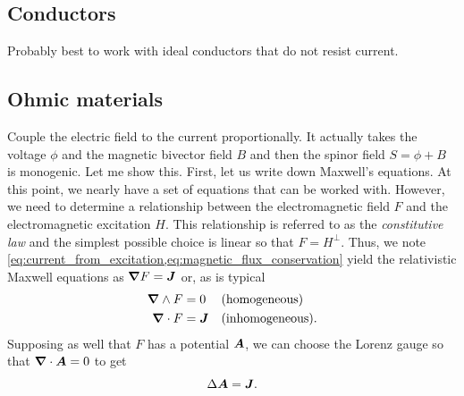 \documentclass{article}
\begin{document}
\subsection{Conductors}

Probably best to work with ideal conductors that do not resist current.

\subsection{Ohmic materials}

Couple the electric field to the current proportionally. It actually takes the voltage $\phi$ and the magnetic bivector field $B$ and then the spinor field $S=\phi +B$ is monogenic. Let me show this. First, let us write down Maxwell's equations. At this point, we nearly have a set of equations that can be worked with. However, we need to determine a relationship between the electromagnetic field $F$ and the electromagnetic excitation $H$. This relationship is referred to as the \emph{constitutive law} and the simplest possible choice is linear so that $F = H^\perp$. Thus, we note \cref{eq:current_from_excitation,eq:magnetic_flux_conservation} yield the relativistic Maxwell equations as $\boldsymbol{\nabla} F = \boldsymbol{J}$ or, as is typical
\begin{align}
	\boldsymbol{\nabla} \wedge F &= 0  &&\textrm{(homogeneous)}\\
	\boldsymbol{\nabla} \cdot F &= \boldsymbol{J} && \textrm{(inhomogeneous)}.
\end{align}
Supposing as well that $F$ has a potential $\boldsymbol{A}$, we can choose the Lorenz gauge so that $\boldsymbol{\nabla} \cdot \boldsymbol{A} = 0$ to get
\begin{equation}
\Delta \boldsymbol{A} = \boldsymbol{J}.
\end{equation}
\end{document}
